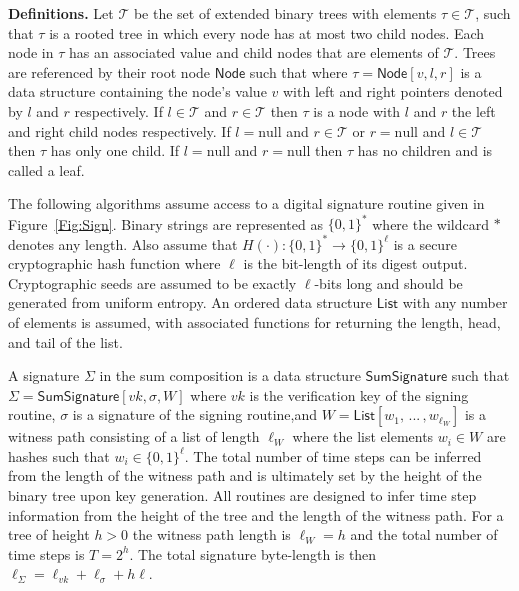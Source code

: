 \documentclass{article}
\begin{document}
\textbf{Definitions.} Let $\mathcal{T}$ be the set of extended binary trees with elements $\tau\in\mathcal{T}$, such that $\tau$ is a rooted tree in which every node has at most two child nodes.  
Each node in $\tau$ has an associated value and child nodes that are elements of $\mathcal{T}$. 
Trees are referenced by their root node {$\mathsf{Node}$\label{def:Node}} such that where $\tau = \mathsf{\hyperref[def:Node]{Node}}[v,l,r]$ is a data structure containing the node's value $v$ with left and right pointers denoted by $l$ and $r$ respectively.
If $l\in \mathcal{T}$ and $r\in\mathcal{T}$ then $\tau$ is a node with $l$ and $r$ the left and right child nodes respectively. 
If $l=\mathrm{null}$ and $r\in\mathcal{T}$ or $r=\mathrm{null}$ and $l\in\mathcal{T}$ then $\tau$ has only one child.  If $l=\mathrm{null}$ and $r=\mathrm{null}$ then $\tau$ has no children and is called a leaf.

 The following algorithms assume access to a digital signature routine given in Figure~\ref{Fig:Sign}. 
 Binary strings are represented as $\{0,1\}^*$ where the wildcard $*$ denotes any length. Also assume that $H(\cdot): \{0,1\}^* \to  \{0,1\}^\ell $ is a secure cryptographic hash function where $\ell$ is the bit-length of its digest output. 
 Cryptographic seeds are assumed to be exactly $\ell$-bits long and should be generated from uniform entropy. 
 An ordered data structure { $\mathsf{List}$ \label{def:List}} with any number of elements is assumed, with associated functions for returning the length, head, and tail of the list. 
 
 A signature $\Sigma$ in the sum composition is a data structure {$\mathsf{SumSignature}$\label{def:SumSignature}} such that $\Sigma = \mathsf{\hyperref[def:SumSignature]{SumSignature}}[vk,\sigma,W]$ where $vk$ is the verification key of the signing routine, $\sigma$ is a signature of the signing routine,and $W = \mathsf{\hyperref[def:List]{List}}[w_1,\,...\,,w_{\ell_W}]$ is a witness path consisting of a list of length $\ell_W$ where the list elements $w_i\in W$ are hashes such that $w_i\in\{0,1\}^\ell$.
 The total number of time steps can be inferred from the length of the witness path and is ultimately set by the height of the binary tree upon key generation. 
 All routines are designed to infer time step information from the height of the tree and the length of the witness path. 
 For a tree of height $h>0$ the witness path length is $\ell_W = h$ and the total number of time steps is $T = 2^h$.  The total signature byte-length is then $\ell_\Sigma = \ell_{vk} + \ell_{\sigma} + h \ell$.
\end{document}
